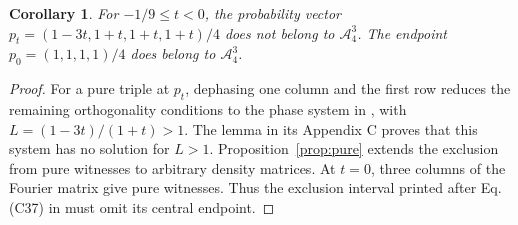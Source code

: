 \documentclass[11pt]{article}
\newtheorem{corollary}[theorem]{Corollary}
\newcommand{\A}{\mathcal A}
\begin{document}
\begin{corollary}\label{cor:radial}
For $-1/9\le t<0$, the probability vector
$p_t=(1-3t,1+t,1+t,1+t)/4$ does not belong to $\A_4^3$.
The endpoint $p_0=(1,1,1,1)/4$ does belong to $\A_4^3$.
\end{corollary}
\begin{proof}
For a pure triple at $p_t$, dephasing one column and the first row
reduces the remaining orthogonality conditions to the phase system
in \cite[Section 4, Eqs. (35)--(38)]{BEKTZ}, with
$L=(1-3t)/(1+t)>1$. The lemma in its Appendix C proves that this
system has no solution for $L>1$. Proposition~\ref{prop:pure} extends
the exclusion from pure witnesses to arbitrary density matrices.
At $t=0$, three columns of the Fourier matrix give pure witnesses.
Thus the exclusion interval printed after Eq. (C37) in \cite{KCPZ}
must omit its central endpoint.
\end{proof}
\end{document}
